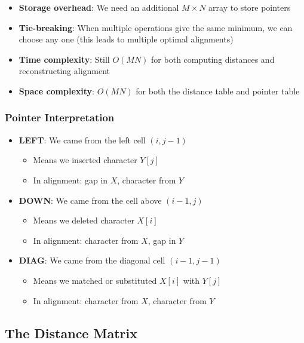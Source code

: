 \documentclass[11pt,a4paper]{article}
\theoremstyle{definition}
\theoremstyle{plain}
\theoremstyle{remark}
\begin{document}
\begin{itemize}
    \item \textbf{Storage overhead}: We need an additional $M \times N$ array to store pointers
    \item \textbf{Tie-breaking}: When multiple operations give the same minimum, we can choose any one (this leads to multiple optimal alignments)
    \item \textbf{Time complexity}: Still $O(MN)$ for both computing distances and reconstructing alignment
    \item \textbf{Space complexity}: $O(MN)$ for both the distance table and pointer table
\end{itemize}

\subsubsection{Pointer Interpretation}

\begin{itemize}
    \item \textbf{LEFT}: We came from the left cell $(i, j-1)$
    \begin{itemize}
        \item Means we inserted character $Y[j]$
        \item In alignment: gap in $X$, character from $Y$
    \end{itemize}
    
    \item \textbf{DOWN}: We came from the cell above $(i-1, j)$
    \begin{itemize}
        \item Means we deleted character $X[i]$
        \item In alignment: character from $X$, gap in $Y$
    \end{itemize}
    
    \item \textbf{DIAG}: We came from the diagonal cell $(i-1, j-1)$
    \begin{itemize}
        \item Means we matched or substituted $X[i]$ with $Y[j]$
        \item In alignment: character from $X$, character from $Y$
    \end{itemize}
\end{itemize}

\subsection{The Distance Matrix}
\end{document}
